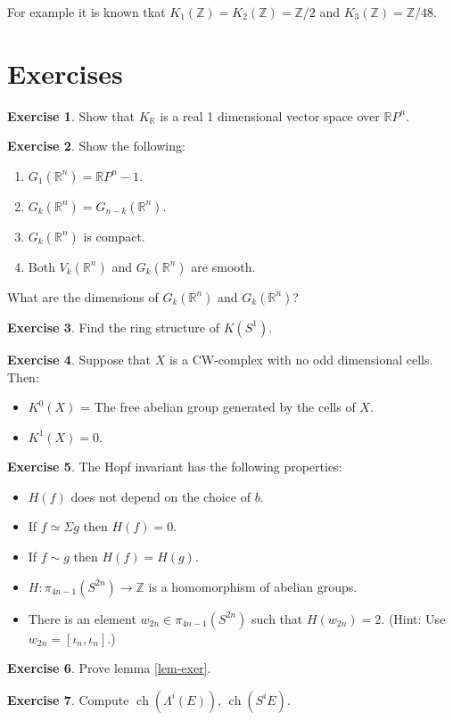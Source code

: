 \documentclass[a4paper,10pt]{article}
\theoremstyle{plain}%
\theoremstyle{definition}
\newtheorem{exerrep}{Exercise}
\theoremstyle{remark}
\newcommand{\ZZ}{\mathbb{Z}}
\newcommand{\RR}{\mathbb{R}}
\newcommand{\susp}{\Sigma}  %
\newcommand{\htpyequiv}{\simeq}  %
\newcommand{\htpic}{\sim}  %
\DeclareMathOperator{\ch}{ch}
\begin{document}
For example it is known tkat $K_1(\ZZ)=K_2(\ZZ)=\ZZ/2$ and $K_3(\ZZ)=\ZZ/48$. 

\section{Exercises}

\begin{exerrep}
 Show that $K_\RR$ is a real 1 dimensional vector space over $\RR P^n$.
\end{exerrep}

\begin{exerrep}
Show the following:
 \begin{enumerate}
  \item $G_1(\RR^n)=\RR P^n-1$.
  \item $G_k(\RR^n) = G_{n-k}(\RR^n)$.
  \item $G_k(\RR^n)$ is compact.
  \item Both $V_k(\RR^n)$ and $G_k(\RR^n)$ are smooth.
 \end{enumerate}
What are the dimensions of $G_k(\RR^n)$ and $G_k(\RR^n)$?
\end{exerrep}

\begin{exerrep}
Find the ring structure of $K(S^1).$
\end{exerrep}

\begin{exerrep}
  Suppose that $X$ is a CW-complex with no odd dimensional cells. Then:
  \begin{itemize}
  \item $K^0(X)$ = The free abelian group generated by the cells of $X$.
    \item $K^1(X) = 0$. 
  \end{itemize}
\end{exerrep}


\begin{exerrep}
The Hopf invariant has the following properties:
\begin{itemize}
\item[0)] $H(f)$ does not depend on the choice of $b$.
\item[1)] If $f\htpyequiv \susp g$ then $H(f)=0$.
\item[2)] If $f\htpic g$ then $H(f)=H(g)$.
\item[3)] $H:\pi_{4n-1}(S^{2n})\to \ZZ$ is a homomorphism of abelian groups.
\item[4)] There is an element $w_{2n}\in \pi_{4n-1}(S^{2n})$ such that $H(w_{2n})=2$. (Hint: Use $w_{2n}=[\iota_n,\iota_n]$.)
\end{itemize}
\end{exerrep}

\begin{exerrep}
 Prove lemma \ref{lem-exer}.
\end{exerrep}

\begin{exerrep}
Compute $\ch(\Lambda^i(E))$, $\ch(S^i E)$.
\end{exerrep}
\end{document}

